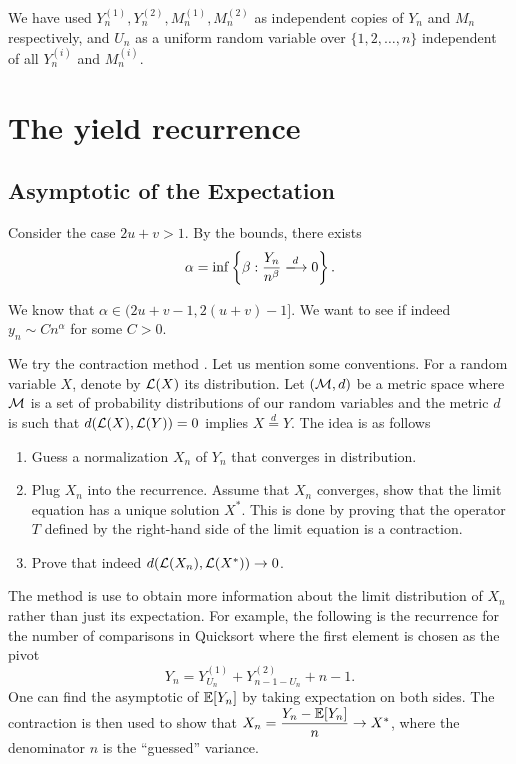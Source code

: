 We have used $Y_n^{(1)}, Y_n^{(2)}, M_n^{(1)}, M_n^{(2)}$ as independent copies of $Y_n$ and $M_n$ respectively, and $U_n$ as a uniform random variable over $\{1, 2, \ldots, n\}$ independent of all $Y_n^{(i)}$ and $M_n^{(i)}$.

\section{The yield recurrence}

\subsection{Asymptotic of the Expectation}

Consider the case $2u+v>1$. By the bounds,  there exists
$$\alpha = \inf\left\{\beta: \dfrac{Y_n}{n^\beta} \xlongrightarrow{d} 0\right\}.$$

We know that $\alpha \in (2u+v-1, 2(u+v)-1]$. We want to see if indeed $y_n \sim C n^\alpha$ for some $C>0$.

We try the contraction method \cite{ludgercontraction,neininger2004general, drmota2009random}. Let us mention some conventions. For a random variable $X$, denote by $\mathcal{L}(X)$ its distribution. Let $(\mathcal{M}, d)$ be a metric space where $\mathcal{M}$ is a set of probability distributions of our random variables and the metric $d$ is such that $d(\mathcal{L}(X),\mathcal{L}(Y))=0$ implies $X \stackrel{d}{=} Y$. The idea is as follows

\begin{enumerate}
  \item Guess a normalization $X_n$ of $Y_n$ that converges in distribution.
  \item Plug $X_n$ into the recurrence. Assume that $X_n$ converges, show that the limit equation has a unique solution $X^*$. This is done by proving that the operator $T$ defined by the right-hand side of the limit equation is a contraction.
  \item Prove that indeed $d(\mathcal{L}(X_n), \mathcal{L}(X^*)) \to 0$.
\end{enumerate}

The method is use to obtain more information about the limit distribution of $X_n$ rather than just its expectation. For example, the following is the recurrence for the number of comparisons in Quicksort where the first element is chosen as the pivot \cite{drmota2009random}
$$Y_{n} = Y_{U_n}^{(1)} + Y_{n-1-U_n}^{(2)} + n-1.$$
One can find the asymptotic of $\mathbb{E}[Y_n]$ by taking expectation on both sides. The contraction is then used to show that $X_n = \dfrac{Y_n - \mathbb{E}[Y_n]}{n}\to X^*$, where the denominator $n$ is the ``guessed'' variance.

